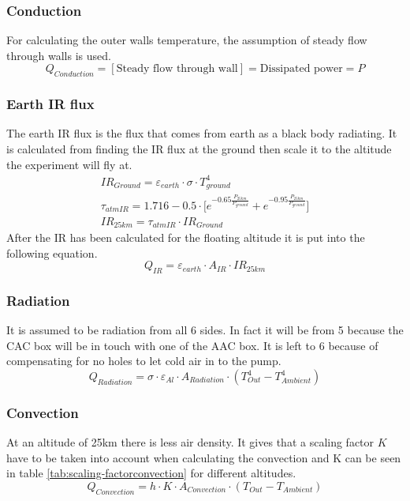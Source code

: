 \subsubsection{Conduction}
For calculating the outer walls temperature, the assumption of steady flow through walls is used.
\begin{equation*}
    Q_{Conduction} = [\text{Steady flow through wall}] = \text{Dissipated power} = P
\end{equation*}

\subsubsection{Earth IR flux}
The earth IR flux is the flux that comes from earth as a black body radiating. It is calculated from finding the IR flux at the ground then scale it to the altitude the experiment will fly at.
\begin{gather*}
    IR_{Ground} = \varepsilon_{earth} \cdot \sigma \cdot T_{ground}^4 \\
    \tau_{atmIR} = 1.716 - 0.5\cdot \Bigg[e^{-0.65\frac{P_{25km}}{P_{ground}}} + e^{-0.95\frac{P_{25km}}{P_{ground}}}\Bigg] \\
    IR_{25km} = \tau_{atmIR} \cdot IR_{Ground}
\end{gather*}
After the IR has been calculated for the floating altitude it is put into the following equation. 
\begin{equation*}
    Q_{IR} = \varepsilon_{earth} \cdot A_{IR} \cdot IR_{25km}
\end{equation*}

\subsubsection{Radiation}
It is assumed to be radiation from all 6 sides. In fact it will be from 5 because the CAC box will be in touch with one of the AAC box. It is left to 6 because of compensating for no holes to let cold air in to the pump.
\begin{equation*}
    Q_{Radiation} = \sigma \cdot \varepsilon_{Al} \cdot A_{Radiation} \cdot (T_{Out}^4 - T_{Ambient}^4 )
\end{equation*}

\subsubsection{Convection}
At an altitude of 25km there is less air density. It gives that a scaling factor $K$ have to be taken into account when calculating the convection and K can be seen in table \ref{tab:scaling-factorconvection} for different altitudes.
\begin{equation*}
    Q_{Convection} = h \cdot K \cdot A_{Convection} \cdot (T_{Out} - T_{Ambient})
\end{equation*}

